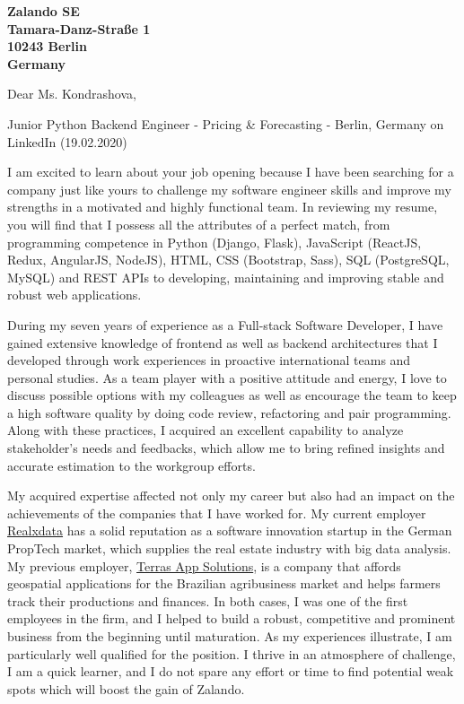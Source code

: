 \documentclass[a4paper]{joaosoares-letter}
\begin{document}
\longindentation=0pt

\begin{letter}{\bfseries Zalando SE\\Tamara-Danz-Straße 1\\10243 Berlin\\Germany}


\date{Berlin, \today}


\opening{Dear Ms. Kondrashova,}{Junior Python Backend Engineer - Pricing \& Forecasting - Berlin, Germany on LinkedIn (19.02.2020)}

I am excited to learn about your job opening because I have been searching for a
company just like yours to challenge my software engineer skills and improve my
strengths in a motivated and highly functional team. In reviewing my resume, you will find
that I possess all the attributes of a perfect match, from programming competence in
Python (Django, Flask), JavaScript (ReactJS, Redux, AngularJS,
NodeJS), HTML, CSS (Bootstrap, Sass), SQL (PostgreSQL, MySQL) and REST APIs to
developing, maintaining and improving stable and robust web applications.

During my seven years of experience as a Full-stack Software Developer, I have gained extensive knowledge of frontend as well as backend architectures that I developed through work experiences in proactive international teams and personal studies. As a team player with a positive attitude and energy, I love to discuss possible options with my colleagues as well as encourage the team to keep a high software quality by doing code review, refactoring and pair programming. Along with these practices, I acquired an excellent capability to analyze stakeholder's needs and feedbacks, which allow me to bring refined insights and accurate estimation to the workgroup efforts.

My acquired expertise affected not only my career but also had an impact on the achievements of the companies that I have worked for. My current employer \href{https://www.realxdata.com/}{Realxdata} has a solid reputation as a software innovation startup in the German PropTech market, which supplies the real estate industry with big data analysis. My previous employer, \href{http://terras.agr.br/}{Terras App Solutions}, is a company that affords geospatial applications for the Brazilian agribusiness market and helps farmers track their productions and finances. In both cases, I was one of the first employees in the firm, and I helped to build a robust, competitive and prominent business from the beginning until maturation. As my experiences illustrate, I am particularly well qualified for the position. I thrive in an atmosphere of challenge, I am a quick learner, and I do not spare any effort or time to find potential weak spots which will boost the gain of Zalando.


\end{letter}
\end{document}
